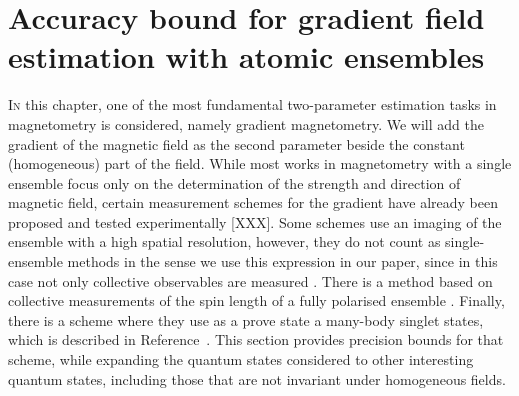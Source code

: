   \section[Metrology of the gradient magnetic field]
{Accuracy bound for gradient field estimation with atomic ensembles}



\lettrine[lines=2, findent=3pt, nindent=0pt]{I}{n} this chapter, one of the most fundamental two-parameter estimation tasks in magnetometry is considered, namely gradient magnetometry.
We will add the gradient of the magnetic field as the second parameter beside the constant (homogeneous) part of the field.
While most works in magnetometry with a single ensemble focus only on the determination of the strength and direction of magnetic field, certain measurement schemes for the gradient have already been proposed and tested experimentally [XXX].
Some schemes use an imaging of the ensemble with a high spatial resolution, however, they do not count as single-ensemble methods in the sense we use this expression in our paper, since in this case not only collective observables are measured  \citep{Vengalattore2007,Zhou2010,Koschorreck2011}.
There is a method based on collective measurements of the spin length of a fully polarised ensemble \citep{Behbood2013}.
Finally, there is a scheme where they use as a prove state a many-body singlet states, which is described in Reference~\citep{Urizar-Lanz2013}.
This section provides precision bounds for that scheme, while expanding the quantum states considered to other interesting quantum states, including those that are not invariant under homogeneous fields.

